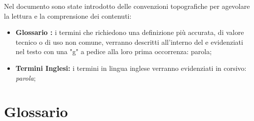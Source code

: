 \documentclass[11pt]{book}              %
\begin{document}
Nel documento sono state introdotto delle convenzioni topografiche per agevolare la lettura e la comprensione dei contenuti:

\begin{itemize}
	\item \textbf{Glossario :}  i termini che richiedono una definizione più accurata, di valore tecnico o di uso non comune, verranno descritti all'interno del  e evidenziati nel testo con una "g" a pedice alla loro prima occorrenza: parola;
	\item \textbf{Termini Inglesi:} i termini in lingua inglese verranno evidenziati in corsivo: \textit{parola};


\end{itemize}
\newpage
\thispagestyle{empty}

\tableofcontents    

\listoffigures

\listoftables

\newpage
\thispagestyle{empty}

\cfoot{}
\renewcommand{\footrulewidth}{0.2pt}
\newcommand{\numref}[1]{\textsl{\nameref{#1} (\ref{#1})}}                
\mainmatter       
  










\newpage

\chapter{Glossario}
\label{Glossario}
\end{document}
